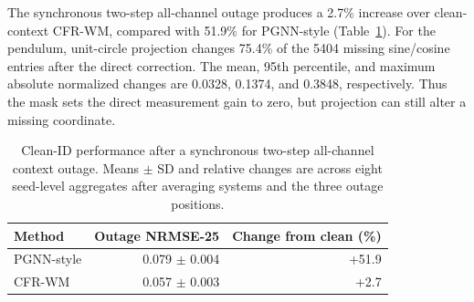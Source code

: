 \documentclass[iicol,pdflatex,sn-basic,Numbered]{sn-jnl}
\newcommand{\ProjectionMissingEntries}{5404}
\newcommand{\ProjectionChangedFraction}{75.4}
\newcommand{\ProjectionMeanChange}{0.0328}
\newcommand{\ProjectionPChange}{0.1374}
\newcommand{\ProjectionMaxChange}{0.3848}
\begin{document}
\begin{table}[t]
\centering
\caption{Classical baselines and inference-time residual-scale
analysis. Entries are seed-balanced mean NRMSE-25 across the indicated fixed
cells. The scale analysis holds trained CFR-WM weights fixed and isolates the
residual contribution.}
\label{tab:posthoc-baseline}
\end{table}

The synchronous two-step all-channel outage produces a 2.7\% increase over
clean-context CFR-WM, compared with 51.9\% for PGNN-style
(Table~\ref{tab:structured-outage}). For the pendulum, unit-circle projection
changes \ProjectionChangedFraction\% of the \ProjectionMissingEntries{}
missing sine/cosine entries after the direct correction. The mean, 95th
percentile, and maximum absolute normalized changes are \ProjectionMeanChange{},
\ProjectionPChange{}, and \ProjectionMaxChange{}, respectively. Thus the mask
sets the direct measurement gain to zero, but projection can still alter a
missing coordinate.

\begin{table}[t]
\centering
\caption{Clean-ID performance after a synchronous two-step all-channel context
outage. Means $\pm$ SD and relative changes are across eight seed-level
aggregates after averaging systems and the three outage positions.}
\label{tab:structured-outage}
\begin{tabular}{lrr}
\toprule
Method & Outage NRMSE-25 & Change from clean (\%) \\
\midrule
PGNN-style & 0.079 $\pm$ 0.004 & +51.9 \\
CFR-WM & 0.057 $\pm$ 0.003 & +2.7 \\
\bottomrule
\end{tabular}
\end{table}
\end{document}
